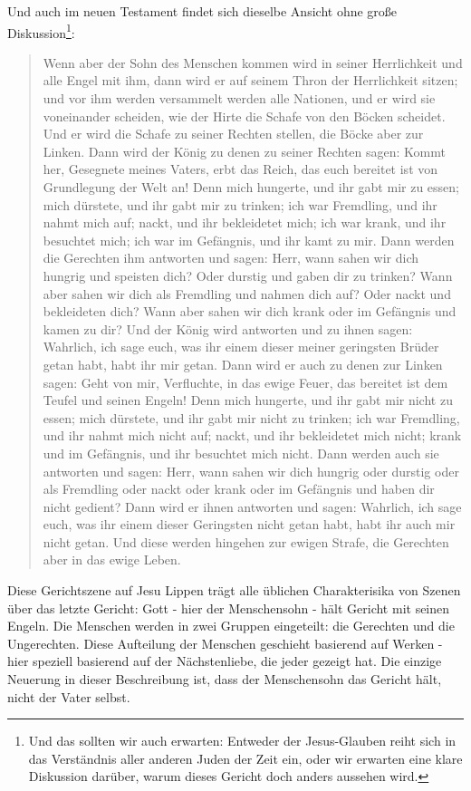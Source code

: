 Und auch im neuen Testament findet sich dieselbe Ansicht ohne große Diskussion\footnote{
	Und das sollten wir auch erwarten: Entweder der Jesus-Glauben reiht sich in das Verständnis aller anderen Juden der Zeit ein,
	oder wir erwarten eine klare Diskussion darüber, warum dieses Gericht doch anders aussehen wird.
}:
\begin{quote}
	Wenn aber der Sohn des Menschen kommen wird in seiner Herrlichkeit und alle Engel mit ihm, dann wird er auf seinem Thron der Herrlichkeit sitzen;
	und vor ihm werden versammelt werden alle Nationen, und er wird sie voneinander scheiden, wie der Hirte die Schafe von den Böcken scheidet.
	Und er wird die Schafe zu seiner Rechten stellen, die Böcke aber zur Linken.
	Dann wird der König zu denen zu seiner Rechten sagen: Kommt her, Gesegnete meines Vaters, erbt das Reich, das euch bereitet ist von Grundlegung der Welt an!
	Denn mich hungerte, und ihr gabt mir zu essen; mich dürstete, und ihr gabt mir zu trinken; ich war Fremdling, und ihr nahmt mich auf;
	nackt, und ihr bekleidetet mich; ich war krank, und ihr besuchtet mich; ich war im Gefängnis, und ihr kamt zu mir.
	Dann werden die Gerechten ihm antworten und sagen: Herr, wann sahen wir dich hungrig und speisten dich? Oder durstig und gaben dir zu trinken?
	Wann aber sahen wir dich als Fremdling und nahmen dich auf? Oder nackt und bekleideten dich?
	Wann aber sahen wir dich krank oder im Gefängnis und kamen zu dir?
	Und der König wird antworten und zu ihnen sagen: Wahrlich, ich sage euch, was ihr einem dieser meiner geringsten Brüder getan habt, habt ihr mir getan.
	Dann wird er auch zu denen zur Linken sagen: Geht von mir, Verfluchte, in das ewige Feuer, das bereitet ist dem Teufel und seinen Engeln!
	Denn mich hungerte, und ihr gabt mir nicht zu essen; mich dürstete, und ihr gabt mir nicht zu trinken;
	ich war Fremdling, und ihr nahmt mich nicht auf; nackt, und ihr bekleidetet mich nicht; krank und im Gefängnis, und ihr besuchtet mich nicht.
	Dann werden auch sie antworten und sagen: Herr, wann sahen wir dich hungrig oder durstig oder als Fremdling oder nackt oder krank oder im Gefängnis und haben dir nicht gedient?
	Dann wird er ihnen antworten und sagen: Wahrlich, ich sage euch, was ihr einem dieser Geringsten nicht getan habt, habt ihr auch mir nicht getan.
	Und diese werden hingehen zur ewigen Strafe, die Gerechten aber in das ewige Leben.
\end{quote}
Diese Gerichtszene auf Jesu Lippen trägt alle üblichen Charakterisika von Szenen über das letzte Gericht:
Gott - hier der Menschensohn - hält Gericht mit seinen Engeln. Die Menschen werden in zwei Gruppen eingeteilt: die Gerechten und die Ungerechten.
Diese Aufteilung der Menschen geschieht basierend auf Werken - hier speziell basierend auf der Nächstenliebe, die jeder gezeigt hat.
Die einzige Neuerung in dieser Beschreibung ist, dass der Menschensohn das Gericht hält, nicht der Vater selbst.

